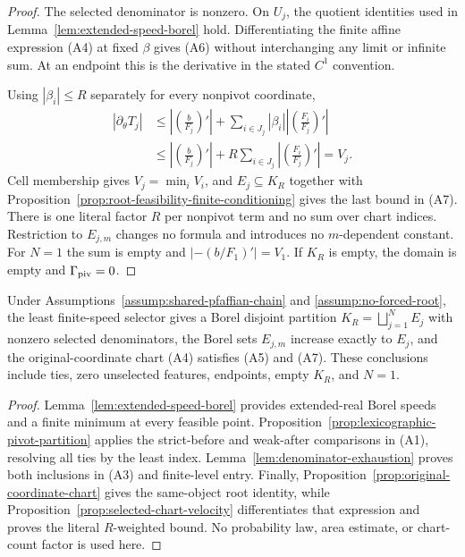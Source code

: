 \begin{proof}
The selected denominator is nonzero.  On $U_j$, the quotient identities
used in Lemma~\ref{lem:extended-speed-borel} hold.  Differentiating the
finite affine expression \textup{(A4)} at fixed $\beta$ gives
\textup{(A6)} without interchanging any limit or infinite sum.  At an
endpoint this is the derivative in the stated $C^1$ convention.

Using $|\beta_i|\leq R$ separately for every nonpivot coordinate,
\[
\begin{aligned}
|\partial_\theta T_j|
&\leq\left|\left(\frac b{F_j}\right)'\right|
 +\sum_{i\in J_j}|\beta_i|
  \left|\left(\frac{F_i}{F_j}\right)'\right|\\
&\leq\left|\left(\frac b{F_j}\right)'\right|
 +R\sum_{i\in J_j}
  \left|\left(\frac{F_i}{F_j}\right)'\right|=V_j.
\end{aligned}
\]
Cell membership gives $V_j=\min_iV_i$, and
$E_j\subseteq K_R$ together with
Proposition~\ref{prop:root-feasibility-finite-conditioning} gives the last
bound in \textup{(A7)}.  There is one literal factor $R$ per nonpivot term
and no sum over chart indices.  Restriction to $E_{j,m}$ changes no formula
and introduces no $m$-dependent constant.  For $N=1$ the sum is empty and
$|-(b/F_1)'|=V_1$.  If $K_R$ is empty, the domain is empty and
$\Gamma_{\rm piv}=0$.
\end{proof}

\begin{proposition}
\label{prop:measurable-adaptive-charts}
Under Assumptions~\ref{assump:shared-pfaffian-chain} and
\ref{assump:no-forced-root}, the least finite-speed selector gives a Borel
disjoint partition $K_R=\bigsqcup_{j=1}^NE_j$ with nonzero selected
denominators, the Borel sets $E_{j,m}$ increase exactly to $E_j$, and the
original-coordinate chart \textup{(A4)} satisfies \textup{(A5)} and
\textup{(A7)}.  These conclusions include ties, zero unselected features,
endpoints, empty $K_R$, and $N=1$.
\end{proposition}

\begin{proof}
Lemma~\ref{lem:extended-speed-borel} provides extended-real Borel speeds and
a finite minimum at every feasible point.
Proposition~\ref{prop:lexicographic-pivot-partition} applies the
strict-before and weak-after comparisons in \textup{(A1)}, resolving all
ties by the least index.  Lemma~\ref{lem:denominator-exhaustion} proves both
inclusions in \textup{(A3)} and finite-level entry.  Finally,
Proposition~\ref{prop:original-coordinate-chart} gives the same-object root
identity, while Proposition~\ref{prop:selected-chart-velocity}
differentiates that expression and proves the literal $R$-weighted bound.
No probability law, area estimate, or chart-count factor is used here.
\end{proof}

